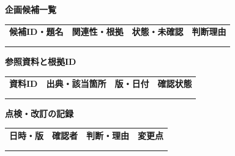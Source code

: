 \documentclass[11pt,a4paper]{article}
\begin{document}
\par{}\noindent\textbf{企画候補一覧}\par\vspace{1mm}
{\fontsize{8.5}{13}\selectfont
\begin{tabularx}{\linewidth}{@{}XXXX@{}}
\textbf{候補ID・題名} & \textbf{関連性・根拠} & \textbf{状態・未確認} & \textbf{判断理由}\\[2mm]
\strut & \strut & \strut & \strut\\[5mm]
\strut & \strut & \strut & \strut\\[5mm]
\end{tabularx}
}\vspace{2mm}\par
{}
\par{}\noindent\textbf{参照資料と根拠ID}\par\vspace{1mm}
{\fontsize{8.5}{13}\selectfont
\begin{tabularx}{\linewidth}{@{}XXXX@{}}
\textbf{資料ID} & \textbf{出典・該当箇所} & \textbf{版・日付} & \textbf{確認状態}\\[2mm]
\strut & \strut & \strut & \strut\\[5mm]
\strut & \strut & \strut & \strut\\[5mm]
\end{tabularx}
}\vspace{2mm}\par
{}
\par{}\noindent\textbf{点検・改訂の記録}\par\vspace{1mm}
{\fontsize{8.5}{13}\selectfont
\begin{tabularx}{\linewidth}{@{}XXXX@{}}
\textbf{日時・版} & \textbf{確認者} & \textbf{判断・理由} & \textbf{変更点}\\[2mm]
\strut & \strut & \strut & \strut\\[5mm]
\strut & \strut & \strut & \strut\\[5mm]
\end{tabularx}
}\vspace{2mm}\par
\end{document}
